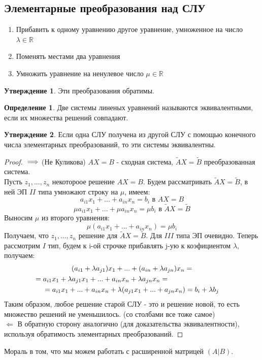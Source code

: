 \documentclass[a4paper, 12pt]{article}
\newcommand{\R}{\mathbb R}
\newcommand\tab[1][.5cm]{\hspace*{#1}}
\theoremstyle{definition}
\newtheorem*{definition}{Определение}
\newtheorem*{subtheorem}{Утверждение}
\begin{document}
    \subsection{Элементарные преобразования над СЛУ}
    \begin{enumerate}
      \item Прибавить к одному уравнению другое уравнение, умноженное на число $\lambda \in \R$
      \item Поменять местами два уравнения
      \item Умножить уравнение на ненулевое число $\mu \in \R$
    \end{enumerate}
    \begin{subtheorem}
      Эти преобразования обратимы.
    \end{subtheorem}
    \begin{definition}
      Две системы линеных уравнений называются эквивалентными, если их множества решений совпадают.
    \end{definition}
    \begin{subtheorem}
      Если одна СЛУ получена из другой СЛУ с помощью конечного числа элементарных преобразований, то эти системы эквивалентны.
    \end{subtheorem}
    \begin{proof}
      $ \\ \Longrightarrow$ (Не Куликова) 
      $AX = B$ - сходная система, $\tilde{A} X = \tilde{B}$ преобразованная система. \\
      Пусть ${z_1,...,z_n}$ некотороое решение $AX = B$. Будем рассматривать $\tilde{A} X = \tilde{B}$, в ней ЭП $II$ типа умножают строку на $\mu$, имеем:
      $$a_{i1}x_1 +...+ a_{in}x_n = b_{i} \text{ в } AX = B$$
      $$\mu a_{i1}x_1 +...+\mu a_{in}x_n = \mu b_i \text{ в } \tilde{A} X = \tilde{B}$$ 
      Выносим $\mu$ из второго уравнения:
      $$\mu (a_{i1}x_1 +...+ a_{in}x_n) = \mu b_i$$
      Получаем, что ${z_1,...,z_n}$ решение для $\tilde{A} X = \tilde{B}$. Для $III$ типа ЭП очевидно. Теперь рассмотрим $I$ тип, будем к i-ой строчке прибавлять j-ую к коэфициентом $\lambda$, получаем:
      \begin{multline*}
      (a_{i1}+\lambda a_{j1})x_1 +...+(a_{in}+\lambda a_{jn})x_n = \\ = a_{i1}x_1+\lambda a_{j1}x_1 +...+a_{in}x_n+\lambda a_{jn}x_n = \tab[3cm] \\ = a_{i1}x_1 + ... + a_{in}x_n + \lambda (a_{j1}x_1 +...+ a_{jn}x_n) = b_i + \lambda b_j
      \end{multline*}
      Таким образом, любое решение старой СЛУ - это и решение новой, то есть множество
      решений не уменьшилось. (со столбами все тоже самое) \\
      $\Longleftarrow$ В обратную сторону аналогично (для доказательства эквивалентности), используя обратимость элементарных преобразований.
    \end{proof}
    Мораль в том, что мы можем работать с расширенной матрицей $(A|B)$.
    \newpage
\end{document}
